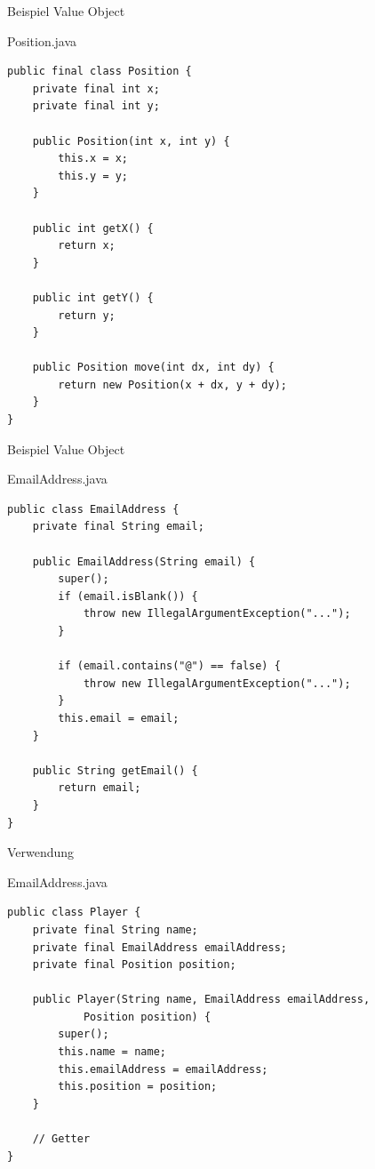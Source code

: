 \begin{frame}[fragile]{Beispiel Value Object}
	\begin{exampleblock}{Position.java}
		\begin{lstlisting}[basicstyle=\tiny]
public final class Position {
	private final int x;
	private final int y;

	public Position(int x, int y) {
		this.x = x;
		this.y = y;
	}

	public int getX() {
		return x;
	}

	public int getY() {
		return y;
	}

	public Position move(int dx, int dy) {
		return new Position(x + dx, y + dy);
	}
}
		\end{lstlisting}
	\end{exampleblock}
\end{frame}

\begin{frame}[fragile]{Beispiel Value Object}
	\begin{exampleblock}{EmailAddress.java}
		\begin{lstlisting}[basicstyle=\tiny]
public class EmailAddress {
	private final String email;

	public EmailAddress(String email) {
		super();
		if (email.isBlank()) {
			throw new IllegalArgumentException("...");
		}
		
		if (email.contains("@") == false) {
			throw new IllegalArgumentException("...");
		}
		this.email = email;
	}
	
	public String getEmail() {
		return email;
	}
}
		\end{lstlisting}
	\end{exampleblock}
\end{frame}

\begin{frame}[fragile]{Verwendung}
	\begin{exampleblock}{EmailAddress.java}
		\begin{lstlisting}
public class Player {
	private final String name;
	private final EmailAddress emailAddress;
	private final Position position;

	public Player(String name, EmailAddress emailAddress, 
			Position position) {
		super();
		this.name = name;
		this.emailAddress = emailAddress;
		this.position = position;
	}

	// Getter
}
		\end{lstlisting}
	\end{exampleblock}
\end{frame}